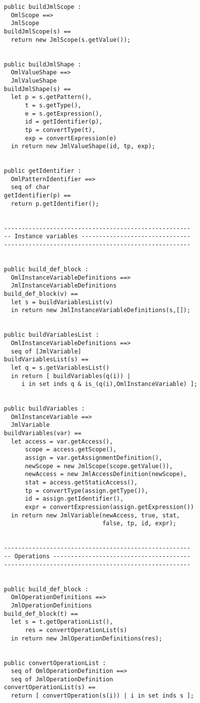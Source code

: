 \begin{lstlisting}
public buildJmlScope : 
  OmlScope ==> 
  JmlScope
buildJmlScope(s) == 
  return new JmlScope(s.getValue());


public buildJmlShape : 
  OmlValueShape ==> 
  JmlValueShape
buildJmlShape(s) == 
  let p = s.getPattern(),
	  t = s.getType(),
	  e = s.getExpression(),
	  id = getIdentifier(p),
	  tp = convertType(t),
	  exp = convertExpression(e)
  in return new JmlValueShape(id, tp, exp);


public getIdentifier : 
  OmlPatternIdentifier ==> 
  seq of char
getIdentifier(p) == 
  return p.getIdentifier();


-----------------------------------------------------
-- Instance variables -------------------------------
-----------------------------------------------------


public build_def_block : 
  OmlInstanceVariableDefinitions ==> 
  JmlInstanceVariableDefinitions
build_def_block(v) == 
  let s = buildVariablesList(v)
  in return new JmlInstanceVariableDefinitions(s,[]);


public buildVariablesList : 
  OmlInstanceVariableDefinitions ==> 
  seq of [JmlVariable]
buildVariablesList(s) == 
  let q = s.getVariablesList()
  in return [ buildVariables(q(i)) | 
     i in set inds q & is_(q(i),OmlInstanceVariable) ];


public buildVariables : 
  OmlInstanceVariable ==> 
  JmlVariable
buildVariables(var) == 
  let access = var.getAccess(),
      scope = access.getScope(),
      assign = var.getAssignmentDefinition(),
      newScope = new JmlScope(scope.getValue()),
      newAccess = new JmlAccessDefinition(newScope),
      stat = access.getStaticAccess(),
      tp = convertType(assign.getType()),
      id = assign.getIdentifier(),              
      expr = convertExpression(assign.getExpression())
  in return new JmlVariable(newAccess, true, stat, 
                            false, tp, id, expr);


-----------------------------------------------------
-- Operations ---------------------------------------
-----------------------------------------------------


public build_def_block : 
  OmlOperationDefinitions ==> 
  JmlOperationDefinitions
build_def_block(t) == 
  let s = t.getOperationList(),
	  res = convertOperationList(s)
  in return new JmlOperationDefinitions(res);


public convertOperationList : 
  seq of OmlOperationDefinition ==> 
  seq of JmlOperationDefinition
convertOperationList(s) == 
  return [ convertOperation(s(i)) | i in set inds s ];



\end{lstlisting}
